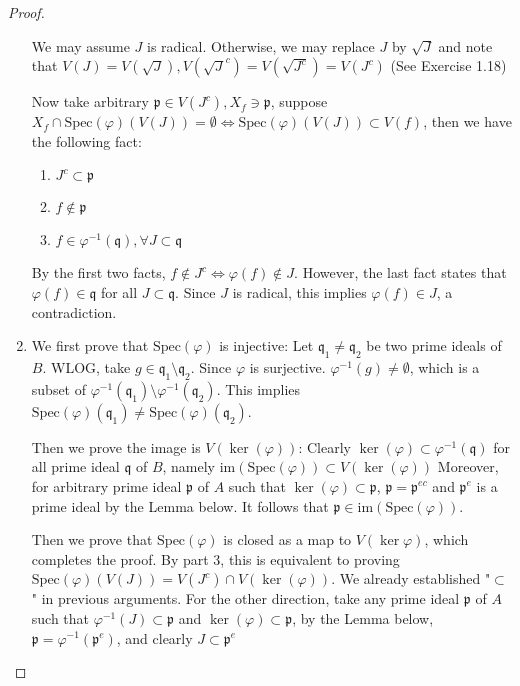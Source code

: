 \documentclass{solution}
\begin{document}
\begin{proof}
\begin{enumerate}
        We may assume $J$ is radical. Otherwise, we may replace $J$ by $\sqrt{J}$ and note that $V(J) = V(\sqrt{J}), V(\sqrt{J}^c) = V(\sqrt{J^c}) = V(J^c)$ (See Exercise 1.18)

        Now take arbitrary $\mathfrak{p} \in V(J^c), X_f \ni \mathfrak{p}$, suppose $X_f \cap \mathrm{Spec}(\varphi) (V(J)) = \emptyset \Leftrightarrow \mathrm{Spec}(\varphi) (V(J)) \subset V(f)$, then we have the following fact:
        \begin{enumerate}
            \item $J^c \subset \mathfrak{p}$
            \item $f \notin \mathfrak{p}$
            \item $f \in \varphi ^{-1}(\mathfrak{q}), \forall J \subset \mathfrak{q}$
        \end{enumerate}
        By the first two facts, $f \notin J^c \Leftrightarrow \varphi(f) \notin J$. However, the last fact states that $\varphi(f) \in \mathfrak{q}$ for all $J \subset \mathfrak{q}$. Since $J$ is radical, this implies $\varphi(f) \in J$, a contradiction.

        \item We first prove that $\mathrm{Spec}(\varphi)$ is injective: Let $\mathfrak{q}_1 \ne \mathfrak{q}_2$ be two prime ideals of $B$. WLOG, take $g \in \mathfrak{q}_1 \setminus \mathfrak{q}_2$. Since $\varphi$ is surjective. $\varphi ^{-1}(g) \ne \emptyset$, which is a subset of $\varphi ^{-1}(\mathfrak{q}_1) \setminus \varphi ^{-1} (\mathfrak{q}_2)$. This implies $\mathrm{Spec}(\varphi)(\mathfrak{q}_1) \ne \mathrm{Spec}(\varphi)(\mathfrak{q}_2)$.
        
        Then we prove the image is $V(\ker (\varphi))$: Clearly $\ker (\varphi) \subset \varphi ^{-1} (\mathfrak{q})$ for all prime ideal $\mathfrak{q}$ of $B$, namely $\mathrm{im}(\mathrm{Spec}(\varphi)) \subset V(\ker (\varphi))$ Moreover, for arbitrary prime ideal $\mathfrak{p}$ of $A$ such that $\ker (\varphi) \subset \mathfrak{p}$, $\mathfrak{p} = \mathfrak{p}^{ec}$ and $\mathfrak{p}^e$ is a prime ideal by the Lemma below. It follows that $\mathfrak{p} \in \mathrm{im}(\mathrm{Spec}(\varphi))$.

        Then we prove that $\mathrm{Spec}(\varphi)$ is closed as a map to $V(\ker \varphi)$, which completes the proof. By part 3, this is equivalent to proving $\mathrm{Spec}(\varphi)(V(J)) = V(J^c) \cap V(\ker (\varphi))$. We already established "$\subset$" in previous arguments. For the other direction, take any prime ideal $\mathfrak{p}$ of $A$ such that $\varphi ^{-1}(J) \subset \mathfrak{p}$ and $\ker (\varphi) \subset \mathfrak{p}$, by the Lemma below, $\mathfrak{p} = \varphi ^{-1}(\mathfrak{p}^e)$, and clearly $J \subset \mathfrak{p}^e$


\end{enumerate}
\end{proof}
\end{document}
